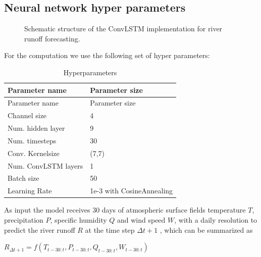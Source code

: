 \documentclass[
]{agujournal2019}
\begin{document}
\subsection{Neural network hyper
parameters}\label{neural-network-hyper-parameters}

\begin{figure}


\caption{\label{fig-baltNet}Schematic structure of the ConvLSTM
implementation for river runoff forecasting.}

\end{figure}%

For the computation we use the following set of hyper parameters:

\begin{longtable}[]{@{}ll@{}}
\caption{Hyperparameters}\label{tbl-letters}\tabularnewline
\toprule\noalign{}
Parameter name & Parameter size \\
\midrule\noalign{}
\endfirsthead
\toprule\noalign{}
Parameter name & Parameter size \\
\midrule\noalign{}
\endhead
\bottomrule\noalign{}
\endlastfoot
Channel size & 4 \\
Num. hidden layer & 9 \\
Num. timesteps & 30 \\
Conv. Kernelsize & (7,7) \\
Num. ConvLSTM layers & 1 \\
Batch size & 50 \\
Learning Rate & 1e-3 with CosineAnnealing \\
\end{longtable}

As input the model receives 30 days of atmospheric surface fields
temperature \(T\), precipitation \(P\), specific humidity \(Q\) and wind
speed \(W\), with a daily resolution to predict the river runoff \(R\)
at the time step \(\Delta t+1\) , which can be summarized as

\(R_{\Delta t+1} = f\left(T_{t-30:t}, P_{t-30:t}, Q_{t-30:t}, W_{t-30:t}\right)\)
\end{document}
